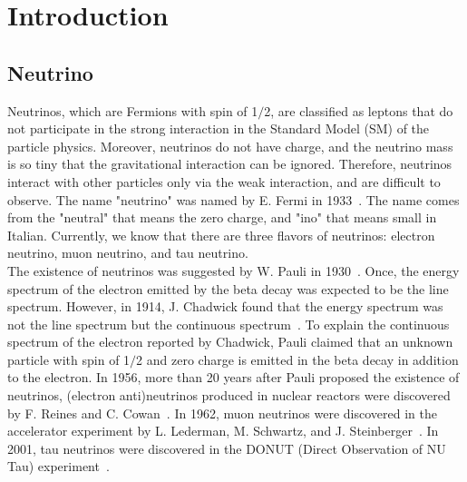 
%
%

\section{Introduction}\label{Section_Introd}

\subsection{Neutrino}
\vs\hs Neutrinos, which are Fermions with spin of 1$/$2, are classified as leptons that do not participate in the strong interaction in the Standard Model (SM) of the particle physics.
Moreover, neutrinos do not have charge, and the neutrino mass is so tiny that the gravitational interaction can be ignored.
Therefore, neutrinos interact with other particles only via the weak interaction, and are difficult to observe.
The name "neutrino" was named by E. Fermi in 1933~\cite{HistoryOfNeutrino}.
The name comes from the "neutral" that means the zero charge, and "ino" that means small in Italian.
Currently, we know that there are three flavors of neutrinos: electron neutrino, muon neutrino, and tau neutrino.\\
\hs The existence of neutrinos was suggested by W. Pauli in 1930~\cite{HistoryOfNeutrino}.
Once, the energy spectrum of the electron emitted by the beta decay was expected to be the line spectrum.
However, in 1914, J. Chadwick found that the energy spectrum was not the line spectrum but the continuous spectrum~\cite{1914Chadwick}.
To explain the continuous spectrum of the electron reported by Chadwick, Pauli claimed that an unknown particle with spin of 1$/$2 and zero charge is emitted in the beta decay in addition to the electron.
In 1956, more than 20 years after Pauli proposed the existence of neutrinos, (electron anti)neutrinos produced in nuclear reactors were discovered by F. Reines and C. Cowan~\cite{1956Reines}.
In 1962, muon neutrinos were discovered in the accelerator experiment by L. Lederman, M. Schwartz, and J. Steinberger~\cite{1962Danby}.
In 2001, tau neutrinos were discovered in the DONUT (Direct Observation of NU Tau) experiment~\cite{2001Kodama}.

